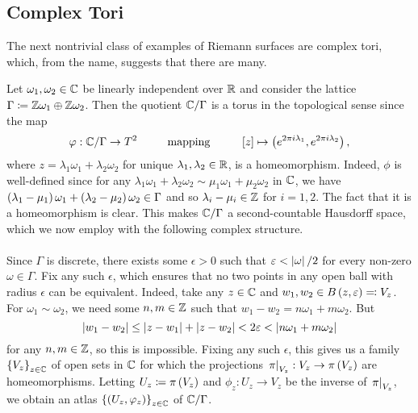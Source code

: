 \subsection{Complex Tori}
The next nontrivial class of examples of Riemann surfaces are complex tori, which, from the name, suggests that there are many.
\begin{example}
    Let $\omega_1,\omega_2\in\mathbb{C}$ be linearly independent over $\mathbb{R}$ and consider the lattice $\Gamma\coloneqq\mathbb{Z}\omega_1\oplus\mathbb{Z}\omega_2$. Then the quotient $\mathbb{C}/\Gamma$ is a torus in the topological sense since the map
    \begin{equation*}
        \phi:\C/\Gamma\to T^2\ \ \ \ \ \ \ \ \textrm{mapping}\ \ \ \ \ \ \ \ \l[z\r]\mapsto\tpl{e^{2\pi i\lambda_1},e^{2\pi i\lambda_2}},
    \end{equation*}
    where $z=\lambda_1\omega_1+\lambda_2\omega_2$ for unique $\lambda_1,\lambda_2\in\mathbb{R}$, is a homeomorphism. Indeed, $\phi$ is well-defined since for any $\lambda_1\omega_1+\lambda_2\omega_2\sim\mu_1\omega_1+\mu_2\omega_2$ in $\mathbb{C}$, we have $\left(\lambda_1-\mu_1\right)\omega_1+\left(\lambda_2-\mu_2\right)\omega_2\in\Gamma$ and so $\lambda_i-\mu_i\in\mathbb{Z}$ for $i=1,2$. The fact that it is a homeomorphism is clear. This makes $\mathbb{C}/\Gamma$ a second-countable Hausdorff space, which we now employ with the following complex structure.\\\ \\
    Since $\Gamma$ is discrete, there exists some $\epsilon>0$ such that $\varepsilon<\left|\omega\right|/2$ for every non-zero $\omega\in\Gamma$. Fix any such $\epsilon$, which ensures that no two points in any open ball with radius $\epsilon$ can be equivalent. Indeed, take any $z\in\mathbb{C}$ and $w_1,w_2\in B\left(z,\varepsilon\right)\eqqcolon V_z$. For $\omega_1\sim\omega_2$, we need some $n,m\in\mathbb{Z}$ such that $w_1-w_2=n\omega_1+m\omega_2$. But
    \begin{equation*}
        \left|w_1-w_2\right|\leq\left|z-w_1\right|+\left|z-w_2\right|<2\varepsilon<\left|n\omega_1+m\omega_2\right|
    \end{equation*}
    for any $n,m\in\mathbb{Z}$, so this is impossible. Fixing any such $\epsilon$, this gives us a family $\left\{V_z\right\}_{z\in\mathbb{C}}$ of open sets in $\mathbb{C}$ for which the projections $\left.\pi\right|_{V_z}:V_z\to\pi\left(V_z\right)$ are homeomorphisms. Letting $U_z\coloneqq\pi\left(V_z\right)$ and $\phi_z:U_z\to V_z$ be the inverse of $\left.\pi\right|_{V_z}$, we obtain an atlas $\left\{\left(U_z,\varphi_z\right)\right\}_{z\in\mathbb{C}}$ of $\mathbb{C}/\Gamma$.
\end{example}
